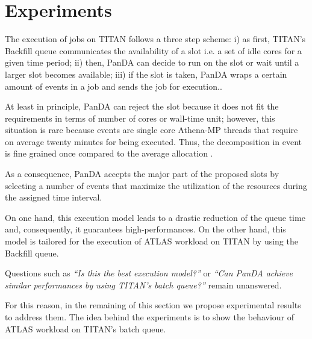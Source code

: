 \section{Experiments}
The execution of jobs on TITAN follows a three step scheme: i) as first, TITAN's Backfill queue communicates  the availability of a slot i.e. a set of idle cores for a given time period; ii) then, PanDA can decide to run on the slot or wait until a larger slot becomes available; iii) if the slot is taken, PanDA wraps a certain amount of events in a job and sends the job for execution..

At least in principle, PanDA can reject the slot because it does not fit the requirements in terms of number of cores or wall-time unit; however, this situation is rare because events are single core Athena-MP threads that require on average twenty minutes for being executed. Thus, the decomposition in event is fine grained once compared to the average allocation .

As a consequence, PanDA accepts the major part of the proposed slots by selecting a number of events that maximize the utilization of the resources during the assigned time interval.

On one hand, this %
execution model leads to a drastic reduction of the queue time and, consequently, it guarantees high-performances. On the other hand, this model is tailored for the execution of ATLAS workload on TITAN by using the Backfill queue.

Questions such as \emph{``Is this the best execution model?''} or \emph{``Can PanDA achieve similar performances by using TITAN's batch queue?''}  remain unanswered.

For this reason, in the remaining of this section we propose experimental results to address them. The idea behind the experiments is to show the behaviour of ATLAS workload on TITAN's batch queue.

